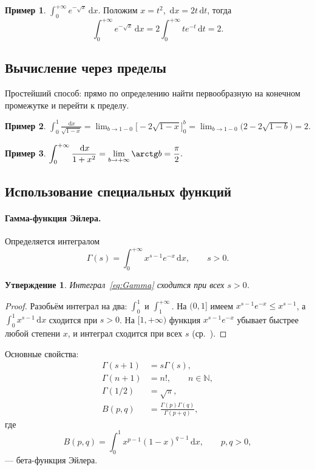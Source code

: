 \documentclass[12pt,a4paper]{article}
\newtheorem{proposition}[theorem]{Утверждение}
\theoremstyle{definition}
\newtheorem{example}{Пример}[section]
\newcommand{\N}{\mathbb{N}}
\newcommand{\dd}{\,\mathrm{d}}
\begin{document}
\begin{example}
$\displaystyle\int_0^{+\infty}e^{-\sqrt{x}}\dd x$. Положим $x=t^2$, $\dd x=2t\dd t$, тогда
\[
\int_0^{+\infty}e^{-\sqrt{x}}\dd x = 2\int_0^{+\infty}te^{-t}\dd t = 2.
\]
\end{example}

\subsection{Вычисление через пределы}

Простейший способ: прямо по определению найти первообразную на конечном промежутке и перейти к пределу.

\begin{example}
$\displaystyle\int_0^1\frac{\dd x}{\sqrt{1-x}} = \lim_{b\to1-0}\bigl[-2\sqrt{1-x}\bigr]_0^b = \lim_{b\to1-0}\bigl(2-2\sqrt{1-b}\bigr)=2.$
\end{example}

\begin{example}
$\displaystyle\int_0^{+\infty}\frac{\dd x}{1+x^2}=\lim_{b\to+\infty}\arctg b = \frac{\pi}{2}.$
\end{example}

\subsection{Использование специальных функций}

\paragraph{Гамма-функция Эйлера.} Определяется интегралом
\begin{equation}\label{eq:Gamma}
\Gamma(s)=\int_0^{+\infty}x^{s-1}e^{-x}\dd x,\qquad s>0.
\end{equation}

\begin{proposition}
Интеграл~\eqref{eq:Gamma} сходится при всех $s>0$.
\end{proposition}

\begin{proof}
Разобьём интеграл на два: $\int_0^1$ и $\int_1^{+\infty}$. На $(0,1]$ имеем $x^{s-1}e^{-x}\le x^{s-1}$, а $\int_0^1 x^{s-1}\dd x$ сходится при $s>0$. На $[1,+\infty)$ функция $x^{s-1}e^{-x}$ убывает быстрее любой степени $x$, и интеграл сходится при всех $s$ (ср.~\cite[гл.~XVII,~\S3]{Zorich2}).
\end{proof}

Основные свойства:
\begin{align*}
\Gamma(s+1)&=s\Gamma(s),\\
\Gamma(n+1)&=n!,\qquad n\in\N,\\
\Gamma(1/2)&=\sqrt{\pi},\\
B(p,q)&=\frac{\Gamma(p)\Gamma(q)}{\Gamma(p+q)},
\end{align*}
где
\[
B(p,q)=\int_0^1 x^{p-1}(1-x)^{q-1}\dd x,\qquad p,q>0,
\]
— бета-функция Эйлера.
\end{document}
